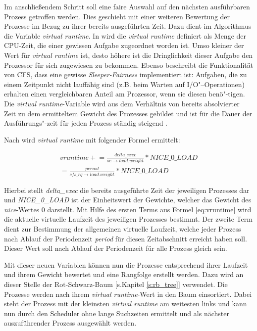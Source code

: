 Im anschließendem Schritt soll eine faire Auswahl auf den nächsten ausführbaren Prozess getroffen werden. Dies geschieht mit einer weiteren Bewertung der Prozesse im Bezug zu ihrer bereits ausgeführten Zeit. 
Dazu dient im Algorithmus die Variable \textit{virtual runtime}. In \cite{mjones} wird die \textit{virtual runtime} definiert als Menge der CPU-Zeit, die einer gewissen Aufgabe zugeordnet worden ist. Umso kleiner der Wert für \textit{virtual runtime} ist, desto höhere ist die Dringlichkeit dieser Aufgabe den Prozessor für sich zugewiesen zu bekommen. Ebenso beschreibt \cite{mjones} die Funktionalität von CFS, dass eine gewisse \textit{Sleeper-Fairness} implementiert ist: Aufgaben, die zu einem Zeitpunkt nicht lauffähig sind (z.B. beim Warten auf I/O"--Operationen) erhalten einen vergleichbaren Anteil am Prozessor, wenn sie diesen benö"-tigen.\\
Die \textit{virtual runtime}-Variable wird aus dem Verhältnis von bereits absolvierter Zeit zu dem ermitteltem Gewicht des Prozesses gebildet und ist für die Dauer der Ausführungs"-zeit für jeden Prozess ständig steigend \cite{rlove}. 

Nach \cite{paperfairness} wird \textit{virtual runtime} mit folgender Formel ermittelt:

\begin{multline}
vruntime \mathrel{+}= \frac{delta\_exec}{se\rightarrow load.weight} * NICE\_0\_LOAD \\ = \frac{period}{cfs\_rq\rightarrow load.weight} * NICE\_0\_LOAD
\label{eq:vruntime}
\end{multline}

Hierbei stellt \textit{delta\_exec} die bereits ausgeführte Zeit der jeweiligen Prozesses dar und \textit{NICE\_0\_LOAD} ist der Einheitswert der Gewichte, welcher das Gewicht des \textit{nice}-Wertes 0 darstellt.  
Mit Hilfe des ersten Terms aus Formel \ref{eq:vruntime} wird die aktuelle virtuelle Laufzeit des jeweiligen Prozesses bestimmt. Der zweite Term dient zur Bestimmung der allgemeinen virtuelle Laufzeit, welche jeder Prozess nach Ablauf der Periodenzeit \textit{period} für diesen Zeitabschnitt erreicht haben soll. Dieser Wert soll nach Ablauf der Periodenzeit für alle Prozess gleich sein.

Mit dieser neuen Variablen können nun die Prozesse entsprechend ihrer Laufzeit und ihrem Gewicht bewertet und eine Rangfolge erstellt werden. Dazu wird an dieser Stelle der Rot-Schwarz-Baum [s.Kapitel \ref{s:rb_tree}] verwendet. Die Prozesse werden nach ihrem \textit{virtual runtime}-Wert in den Baum einsortiert. Dabei steht der Prozess mit der kleinsten \textit{virtual runtime} am weitesten links und kann nun durch den Scheduler ohne lange Suchzeiten ermittelt und als nächster auszuführender Prozess ausgewählt werden. 

